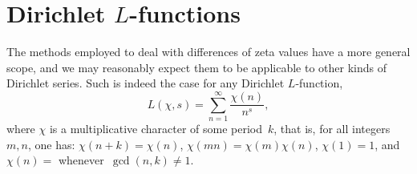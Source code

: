 \documentclass{amsart}
\begin{document}
\section{Dirichlet $L$-functions}\label{dir-sec}

The methods employed to deal with differences of zeta values have a
more general scope, and we may reasonably expect them to be applicable to
other kinds of Dirichlet series.
Such is indeed the case
for any Dirichlet $L$-function,
\[
L(\chi,s)=\sum_{n=1}^\infty \frac{\chi(n)}{n^s},
\]
where $\chi$ is a multiplicative character 
of some period~$k$, that is,
for all integers~$m,n$, one has:
$\chi(n+k)=\chi(n)$,  $\chi(mn)=\chi(m)\chi(n)$, $\chi(1)=1$, and
$\chi(n)=$ whenever~$\gcd(n,k)\not=1$. 


% 
\end{document}
